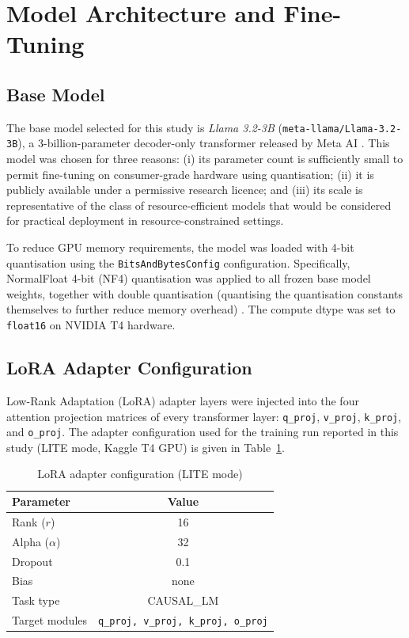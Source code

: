 \section{Model Architecture and Fine-Tuning}

\subsection{Base Model}

The base model selected for this study is \textit{Llama 3.2-3B} (\texttt{meta-llama/Llama-3.2-3B}), a 3-billion-parameter decoder-only transformer released by Meta AI \cite{meta2024llama3}. This model was chosen for three reasons: (i) its parameter count is sufficiently small to permit fine-tuning on consumer-grade hardware using quantisation; (ii) it is publicly available under a permissive research licence; and (iii) its scale is representative of the class of resource-efficient models that would be considered for practical deployment in resource-constrained settings.

To reduce GPU memory requirements, the model was loaded with 4-bit quantisation using the \texttt{BitsAndBytesConfig} configuration. Specifically, NormalFloat 4-bit (NF4) quantisation was applied to all frozen base model weights, together with double quantisation (quantising the quantisation constants themselves to further reduce memory overhead) \cite{dettmers2023qlora}. The compute dtype was set to \texttt{float16} on NVIDIA T4 hardware.

\subsection{LoRA Adapter Configuration}

Low-Rank Adaptation (LoRA) adapter layers \cite{hu2022lora} were injected into the four attention projection matrices of every transformer layer: \texttt{q\_proj}, \texttt{v\_proj}, \texttt{k\_proj}, and \texttt{o\_proj}. The adapter configuration used for the training run reported in this study (LITE mode, Kaggle T4 GPU) is given in Table~\ref{tab:lora}.

\begin{table}[ht]
\centering
\caption{LoRA adapter configuration (LITE mode)}
\label{tab:lora}
\begin{tabular}{lc}
\hline
\textbf{Parameter} & \textbf{Value} \\
\hline
Rank ($r$)             & 16 \\
Alpha ($\alpha$)       & 32 \\
Dropout                & 0.1 \\
Bias                   & none \\
Task type              & CAUSAL\_LM \\
Target modules         & \texttt{q\_proj, v\_proj, k\_proj, o\_proj} \\
\hline
\end{tabular}
\end{table}

